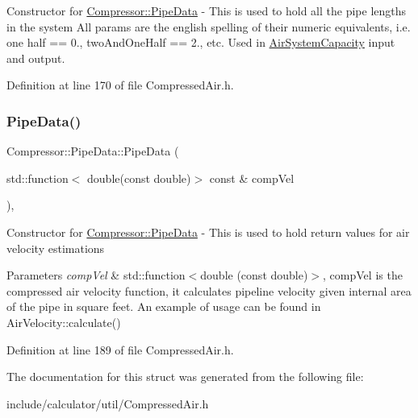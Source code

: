 Constructor for \hyperlink{struct_compressor_1_1_pipe_data}{Compressor\+::\+Pipe\+Data} -\/ This is used to hold all the pipe lengths in the system All params are the english spelling of their numeric equivalents, i.\+e. one half == 0., two\+And\+One\+Half == 2., etc. Used in \hyperlink{class_compressor_1_1_air_system_capacity}{Air\+System\+Capacity} input and output. 

Definition at line 170 of file Compressed\+Air.\+h.

\mbox{\label{struct_compressor_1_1_pipe_data_af7998fd533340b0a84e78fcda91b4806}} 
\subsubsection{\texorpdfstring{Pipe\+Data()}{PipeData()}\hspace{0.1cm}{\footnotesize\ttfamily [2/2]}}
{\footnotesize\ttfamily Compressor\+::\+Pipe\+Data\+::\+Pipe\+Data (\begin{DoxyParamCaption}\item[{std\+::function$<$ double(const double)$>$ const \&}]{comp\+Vel }\end{DoxyParamCaption})\hspace{0.3cm}{\ttfamily [inline]}, {\ttfamily [explicit]}}

Constructor for \hyperlink{struct_compressor_1_1_pipe_data}{Compressor\+::\+Pipe\+Data} -\/ This is used to hold return values for air velocity estimations 
\begin{DoxyParams}{Parameters}
{\em comp\+Vel} & std\+::function$<$double (const double)$>$, comp\+Vel is the compressed air velocity function, it calculates pipeline velocity given internal area of the pipe in square feet. An example of usage can be found in Air\+Velocity\+::calculate() \\
\hline
\end{DoxyParams}


Definition at line 189 of file Compressed\+Air.\+h.



The documentation for this struct was generated from the following file\+:\begin{DoxyCompactItemize}
\item 
include/calculator/util/Compressed\+Air.\+h\end{DoxyCompactItemize}
